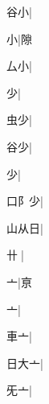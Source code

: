 \begin{multicols}{2}
{{\cjk{}{\cnsym{}　}谷小}|{}\par
{小}|{\cjk{}隙}\par
{厶小}|{}\par
{\cjk{}{\cnsym{}　}{\cnsym{}　}少}|{}\par
{\cjk{}{\cnsym{}　}虫少}|{}\par
{\cjk{}{\cnsym{}　}谷少}|{}\par
{少}|{}\par
{\cjk{}口{阝}少}|{}\par
{\cjk{}山从日}|{}\par
{\cjk{}{\cnsym{}　}卄{\cnjzr{}}}|{}\par
{\cjk{}{\cnsym{}　}{\cnsym{}　}亠}|{\cjk{}亰}\par
{亠}|{}\par
{\cjk{}{\cnsym{}　}車亠}|{}\par
{\cjk{}日大亠}|{}\par
{\cjk{}{\cnsym{}　}旡亠}|{}\par
}
\end{multicols}

